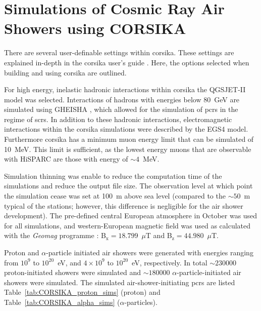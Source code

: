 \chapter{Simulations of Cosmic Ray Air Showers using CORSIKA}\label{app:CORSIKA_sims}


There are several user-definable settings within \gls{corsika}. These settings are explained in-depth in the \gls{corsika} user's guide \citep{heck_extensive_2017}. Here, the options selected when building and using \gls{corsika} are outlined.

For high energy, inelastic hadronic interactions within \gls{corsika} the QGSJET-II \citep{ostapchenko_qgsjet-ii_2006} model was selected. Interactions of hadrons with energies below 80~GeV are simulated using GHEISHA \citep{fesefeldt_gheisha._1985}, which allowed for the simulation of \glspl{pcr} in the regime of \glspl{scr}. In addition to these hadronic interactions, electromagnetic interactions within the \gls{corsika} simulations were described by the EGS4 \citep{nelson_egs4_1985} model. Furthermore \gls{corsika} has a minimum muon energy limit that can be simulated of 10~MeV. This limit is sufficient, as the lowest energy muons that are observable with HiSPARC are those with energy of $\sim4$~MeV.

Simulation thinning was enable to reduce the computation time of the simulations and reduce the output file size. The observation level at which point the simulation cease was set at 100~m above sea level (compared to the $\sim50$~m typical of the stations; however, this difference is negligible for the air shower development). The pre-defined central European atmosphere in October was used for all simulations, and western-European magnetic field was used as calculated with the \textit{Geomag} programme \citep{bgs_world_2020}: B$_{\mathrm{x}}=18.799$~$\mu$T and B$_{\mathrm{z}}=44.980$~$\mu$T.

Proton and $\alpha$-particle initiated air showers were generated with energies ranging from $10^{9}$ to $10^{20}$~eV, and $4\times10^{9}$ to $10^{20}$~eV, respectively. In total $\sim 230000$ proton-initiated showers were simulated and $\sim 180000$ $\alpha$-particle-initiated air showers were simulated. The simulated air-shower-initiating \glspl{pcr} are listed Table~\ref{tab:CORSIKA_proton_sims} (proton) and Table~\ref{tab:CORSIKA_alpha_sims} ($\alpha$-particles).


